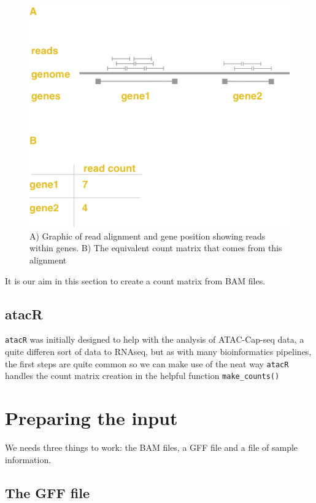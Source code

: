 \documentclass[]{book}
\begin{document}
\begin{figure}
\includegraphics[width=12.78in]{fig/align} \caption{A) Graphic of read alignment and gene position showing reads within genes. B) The equivalent count matrix that comes from this alignment}\label{fig:unnamed-chunk-1}
\end{figure}

It is our aim in this section to create a count matrix from BAM files.

\hypertarget{atacr}{%
\subsection{atacR}\label{atacr}}

\texttt{atacR} was initially designed to help with the analysis of ATAC-Cap-seq data, a quite differen sort of data to RNAseq, but as with many bioinformatics pipelines, the first steps are quite common so we can make use of the neat way \texttt{atacR} handles the count matrix creation in the helpful function \texttt{make\_counts()}

\hypertarget{preparing-the-input}{%
\section{Preparing the input}\label{preparing-the-input}}

We needs three things to work: the BAM files, a GFF file and a file of sample information.

\hypertarget{the-gff-file}{%
\subsection{The GFF file}\label{the-gff-file}}
\end{document}
